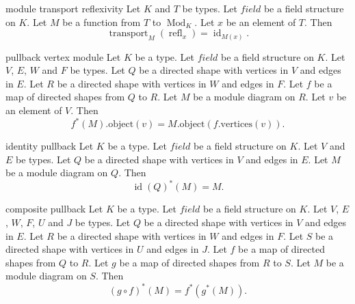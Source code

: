 \begin{cleanresult}{module transport reflexivity}
Let $K$ and $T$ be types.
Let $\mathit{field}$ be a field structure on $K$.
Let $M$ be a function from $T$ to $\operatorname{Mod}_{K}$.
Let $x$ be an element of $T$.
Then \[\operatorname{transport}_{M}(\operatorname{refl}_{x}) = \operatorname{id}_{M(x)}.\]
\end{cleanresult}

\begin{cleanresult}{pullback vertex module}
Let $K$ be a type.
Let $\mathit{field}$ be a field structure on $K$.
Let $V$, $E$, $W$ and $F$ be types.
Let $Q$ be a directed shape with vertices in $V$ and edges in $E$.
Let $R$ be a directed shape with vertices in $W$ and edges in $F$.
Let $f$ be a map of directed shapes from $Q$ to $R$.
Let $M$ be a module diagram on $R$.
Let $v$ be an element of $V$.
Then \[f^{*}(M).\mathrm{object}(v) = M.\mathrm{object}(f.\mathrm{vertices}(v)).\]
\end{cleanresult}

\begin{cleanresult}{identity pullback}
Let $K$ be a type.
Let $\mathit{field}$ be a field structure on $K$.
Let $V$ and $E$ be types.
Let $Q$ be a directed shape with vertices in $V$ and edges in $E$.
Let $M$ be a module diagram on $Q$.
Then \[\operatorname{id}(Q)^{*}(M) = M.\]
\end{cleanresult}

\begin{cleanresult}{composite pullback}
Let $K$ be a type.
Let $\mathit{field}$ be a field structure on $K$.
Let $V$, $E$, $W$, $F$, $U$ and $J$ be types.
Let $Q$ be a directed shape with vertices in $V$ and edges in $E$.
Let $R$ be a directed shape with vertices in $W$ and edges in $F$.
Let $S$ be a directed shape with vertices in $U$ and edges in $J$.
Let $f$ be a map of directed shapes from $Q$ to $R$.
Let $g$ be a map of directed shapes from $R$ to $S$.
Let $M$ be a module diagram on $S$.
Then \[(g \circ f)^{*}(M) = f^{*}(g^{*}(M)).\]
\end{cleanresult}

